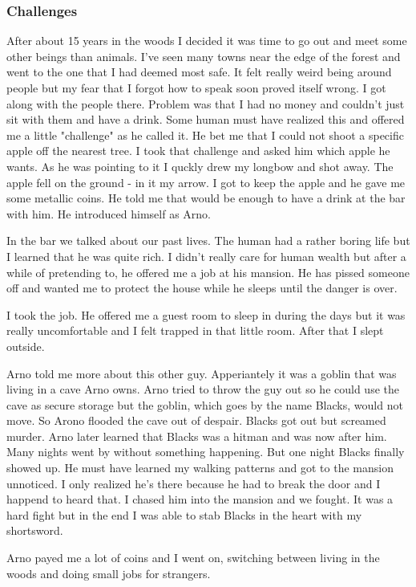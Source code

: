 \documentclass[letterpaper,10pt,twoside,twocolumn,openany]{book}
\begin{document}
	\subsubsection{Challenges}
	After about 15 years in the woods I decided it was time to go out and meet some other beings than animals. I've seen many towns near the edge of the forest and went to the one that I had deemed most safe. It felt really weird being around people but my fear that I forgot how to speak soon proved itself wrong. I got along with the people there. Problem was that I had no money and couldn't just sit with them and have a drink. Some human must have realized this and offered me a little "challenge" as he called it. He bet me that I could not shoot a specific apple off the nearest tree. I took that challenge and asked him which apple he wants. As he was pointing to it I quckly drew my longbow and shot away. The apple fell on the ground - in it my arrow. I got to keep the apple and he gave me some metallic coins. He told me that would be enough to have a drink at the bar with him. He introduced himself as Arno.  
	
	In the bar we talked about our past lives. The human had a rather boring life but I learned that he was quite rich. I didn't really care for human wealth but after a while of pretending to, he offered me a job at his mansion. He has pissed someone off and wanted me to protect the house while he sleeps until the danger is over.
	 
	I took the job. He offered me a guest room to sleep in during the days but it was really uncomfortable and I felt trapped in that little room. After that I slept outside. 
	
	Arno told me more about this other guy. Apperiantely it was a goblin that was living in a cave Arno owns. Arno tried to throw the guy out so he could use the cave as secure storage but the goblin, which goes by the name Blacks, would not move. So Arono flooded the cave out of despair. Blacks got out but screamed murder. Arno later learned that Blacks was a hitman and was now after him. 
	Many nights went by without something happening. But one night Blacks finally showed up. He must have learned my walking patterns and got to the mansion unnoticed. I only realized he's there because he had to break the door and I happend to heard that. I chased him into the mansion and we fought. It was a hard fight but in the end I was able to stab Blacks in the heart with my shortsword. 
	
	Arno payed me a lot of coins and I went on, switching between living in the woods and doing small jobs for strangers. 
	
\end{document}

